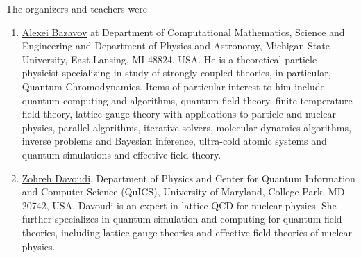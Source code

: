 \documentclass[prc,amsart,english]{revtex4-2}
\begin{document}
The organizers and teachers were




\begin{enumerate}
\item 
\href{https://directory.natsci.msu.edu/Directory/Profiles/Person/101033}{Alexei
Bazavov} at Department of Computational Mathematics, Science and
Engineering and Department of Physics and Astronomy, Michigan State
University, East Lansing, MI 48824, USA. He is a theoretical particle physicist specializing in study of strongly coupled theories, in particular, Quantum Chromodynamics. Items of particular interest to him include quantum computing and algorithms, quantum field theory, finite-temperature field theory, lattice gauge theory with applications to particle and nuclear physics, parallel algorithms, iterative solvers, molecular dynamics algorithms, inverse problems and Bayesian inference, ultra-cold atomic systems and quantum simulations and effective field theory.

\item
  \href{https://umdphysics.umd.edu/people/faculty/current/item/927-davoudi.html}{Zohreh
  Davoudi}, Department of Physics and Center for Quantum Information and Computer Science (QuICS), University of Maryland, College Park,
  MD 20742, USA. Davoudi is an expert in lattice QCD for nuclear physics. She further
  specializes in quantum simulation and computing for quantum field
  theories, including lattice gauge theories and effective field
  theories of nuclear physics.


\end{enumerate}
\end{document}
